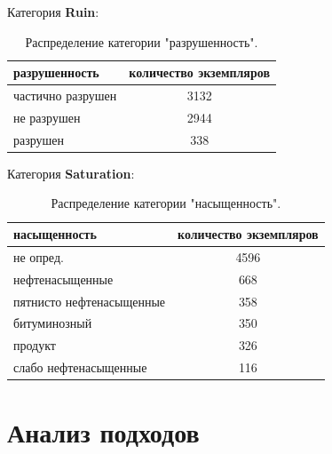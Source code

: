 \documentclass[14pt]{matmex-diploma}
\begin{document}
        Категория \textbf{Ruin}:
        
        \begin{table}[h!]
            \centering
            \begin{tabular}{|l|c|}
                \hline
                \textbf{разрушенность}            & \textbf{количество экземпляров} \\
                \hline
                частично разрушен &  3132 \\
                \hline
                не разрушен       &  2944 \\
                \hline
                разрушен          &   338 \\
                \hline
            \end{tabular}    
            \caption{Распределение категории "разрушенность".}
            \label{table_ruin}
        \end{table}
        
        \vskip 0.2in
        
        Категория \textbf{Saturation}:
        
        \begin{table}[h!]
            \centering
            \begin{tabular}{|l|c|}
                \hline
                \textbf{насыщенность}            & \textbf{количество экземпляров} \\
                \hline
                не опред.                &        4596 \\
                \hline
                нефтенасыщенные          &         668 \\
                \hline
                пятнисто нефтенасыщенные &         358 \\
                \hline
                битуминозный             &         350 \\
                \hline
                продукт                  &         326 \\
                \hline
                слабо нефтенасыщенные    &         116 \\
                \hline
            \end{tabular}    
            \caption{Распределение категории "насыщенность".}
            \label{table_saturation}  
        \end{table}
        

\section{Анализ подходов}
    
\end{document}
